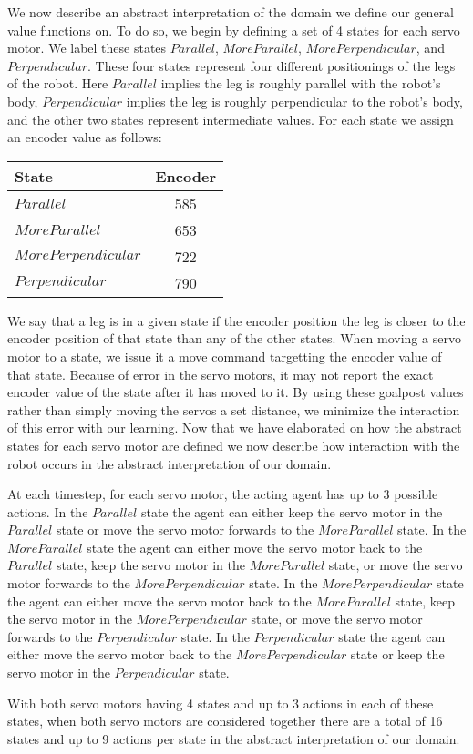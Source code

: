\documentclass[../main.tex]{subfiles}
\begin{document}
We now describe an abstract interpretation of the domain we define our general value functions on. To do so, we begin by defining a set of 4 states for each servo motor. We label these states $Parallel$, $MoreParallel$, $MorePerpendicular$, and $Perpendicular$. These four states represent four different positionings of the legs of the robot. Here $Parallel$ implies the leg is roughly parallel with the robot's body, $Perpendicular$ implies the leg is roughly perpendicular to the robot's body, and the other two states represent intermediate values. For each state we assign an encoder value as follows:

\begin{center}
    \begin{tabular}{|l|c|}
        \hline
        State & Encoder \\
        \hline
        $Parallel$ & 585 \\
        $MoreParallel$ & 653 \\
        $MorePerpendicular$ & 722 \\
        $Perpendicular$ & 790 \\
        \hline
    \end{tabular}
\end{center}

We say that a leg is in a given state if the encoder position the leg is closer to the encoder position of that state than any of the other states. When moving a servo motor to a state, we issue it a move command targetting the encoder value of that state. Because of error in the servo motors, it may not report the exact encoder value of the state after it has moved to it. By using these goalpost values rather than simply moving the servos a set distance, we minimize the interaction of this error with our learning. Now that we have elaborated on how the abstract states for each servo motor are defined we now describe how interaction with the robot occurs in the abstract interpretation of our domain.

At each timestep, for each servo motor, the acting agent has up to 3 possible actions. In the $Parallel$ state the agent can either keep the servo motor in the $Parallel$ state or move the servo motor forwards to the $MoreParallel$ state. In the $MoreParallel$ state the agent can either move the servo motor back to the $Parallel$ state, keep the servo motor in the $MoreParallel$ state, or move the servo motor forwards to the $MorePerpendicular$ state. In the $MorePerpendicular$ state the agent can either move the servo motor back to the $MoreParallel$ state, keep the servo motor in the $MorePerpendicular$ state, or move the servo motor forwards to the $Perpendicular$ state. In the $Perpendicular$ state the agent can either move the servo motor back to the $MorePerpendicular$ state or keep the servo motor in the $Perpendicular$ state.

With both servo motors having 4 states and up to 3 actions in each of these states, when both servo motors are considered together there are a total of 16 states and up to 9 actions per state in the abstract interpretation of our domain.
\end{document}
